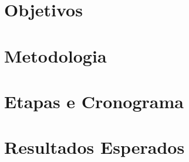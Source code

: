 \documentclass[a4paper, 12pt] {article}
\begin{document}
\section{Objetivos}

\section{Metodologia}

\section{Etapas e Cronograma}

\section{Resultados Esperados}



\end{document}
